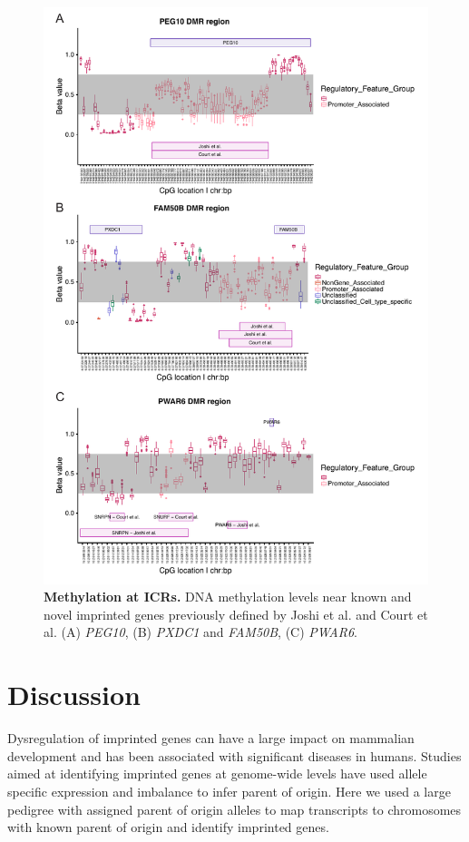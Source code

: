 \begin{figure}[!htb]
\centering \includegraphics[width=5in]{img/ch03/fig-03.pdf}
\caption[Methylation at ICRs.]{\textbf{Methylation at ICRs.} DNA methylation levels near known and novel imprinted genes previously defined by Joshi et al. and Court et al. (A) \emph{PEG10}, (B) \emph{PXDC1} and \emph{FAM50B}, (C) \emph{PWAR6}.}
\label{fig:methylation}
\end{figure}


\section{Discussion}\label{ch03-discussion}
Dysregulation of imprinted genes can have a large impact on mammalian development and has been associated with significant diseases in humans. Studies aimed at identifying imprinted genes at genome-wide levels have used allele specific expression and imbalance to infer parent of origin. Here we used a large pedigree with assigned parent of origin alleles to map transcripts to chromosomes with known parent of origin and identify imprinted genes. 

